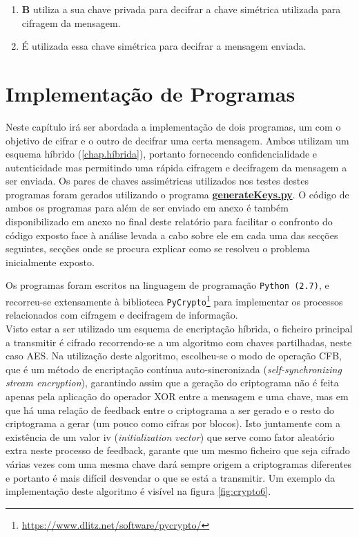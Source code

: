 \documentclass[a4paper,11pt,openright,oneside]{report}
\begin{document}
\begin{enumerate}
\item \textbf{B} utiliza a sua chave privada para decifrar a chave simétrica utilizada para cifragem da mensagem.
\item É utilizada essa chave simétrica para decifrar a mensagem enviada.
\end{enumerate}

\chapter{Implementação de Programas}
\label{chap.programas}

Neste capítulo irá ser abordada a implementação de dois programas, um com o objetivo de cifrar e o outro de decifrar uma certa mensagem. Ambos utilizam um esquema híbrido (\ref{chap.híbrida}), portanto fornecendo confidencialidade e autenticidade mas permitindo uma rápida cifragem e decifragem da mensagem a ser enviada. Os pares de chaves assimétricas utilizados nos testes destes programas foram gerados utilizando o programa \href{run:../Python/KeysGenerator/generateKeys.py}{\textbf{generateKeys.py}}. O código de ambos os programas para além de ser enviado em anexo é também disponibilizado em anexo no final deste relatório para facilitar o confronto do código exposto face à análise levada a cabo sobre ele em cada uma das secções seguintes, secções onde se procura explicar como se resolveu o problema inicialmente exposto.

Os programas foram escritos na linguagem de programação \verb|Python (2.7)|, e recorreu-se extensamente à biblioteca \verb|PyCrypto|\footnote{\url{https://www.dlitz.net/software/pycrypto/}} para implementar os processos relacionados com cifragem e decifragem de informação.\\


Visto estar a ser utilizado um esquema de encriptação híbrida, o ficheiro principal a transmitir é cifrado recorrendo-se a um algoritmo com chaves partilhadas, neste caso AES. Na utilização deste algoritmo, escolheu-se o modo de operação CFB, que é um método de encriptação contínua auto-sincronizada (\textit{self-synchronizing stream encryption}), garantindo assim que a geração do criptograma não é feita apenas pela aplicação do operador XOR entre a mensagem e uma chave, mas em que há uma relação de feedback entre o criptograma a ser gerado e o resto do criptograma a gerar (um pouco como cifras por blocos). Isto juntamente com a existência de um valor iv (\textit{initialization vector}) que serve como fator aleatório extra neste processo de feedback, garante que um mesmo ficheiro que seja cifrado várias vezes com uma mesma chave dará sempre origem a criptogramas diferentes e portanto é mais difícil desvendar o que se está a transmitir. Um exemplo da implementação deste algoritmo é visível na figura \ref{fig:crypto6}.
\end{document}
